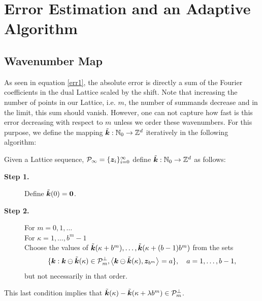 \documentclass[graybox,footinfo]{svmult}
\newcommand{\Z}{\mathbb{Z}} %
\newcommand{\N}{\mathbb{N}} %
\newcommand{\bszero}{\boldsymbol{0}} %
\newcommand{\bsz}{\boldsymbol{z}}    %
\begin{document}
\section{Error Estimation and an Adaptive Algorithm}

\subsection{Wavenumber Map}

As seen in equation \eqref{err1}, the absolute error is directly a sum of the Fourier coefficients in the dual Lattice scaled by the shift. Note that increasing the number of points in our Lattice, i.e. $m$, the number of summands decrease and in the limit, this sum should vanish. However, one can not capture how fast is this error decreasing with respect to $m$ unless we order these wavenumbers. For this purpose, we define the mapping $\tvk: \N_0 \to \Z^d$ iteratively in the following algorithm:

\begin{algo} \label{wavenummapalgo} Given a Lattice sequence, $\cp_{\infty} = \{\bsz_i\}_{i=0}^{\infty}$ define $\tvk: \N_0 \to \Z^d$ as follows:
\begin{description}
\item[\textbf{Step 1.}] Define $\tvk(0)=\bszero$.

\item[\textbf{Step 2.}] For $m=0, 1, \ldots$ \\
\hspace*{1.3cm} For $\kappa = 1, \ldots, b^{m} -1 $ \\
\hspace*{1.6cm} Choose the values of $\tilde{\boldsymbol{k}}(\kappa+b^{m}), \ldots, \tilde{\boldsymbol{k}}(\kappa+(b-1)b^{m})$ from the sets
\[
\{\bsk : \bsk \ominus \tvk(\kappa) \in \cp_{m}^{\perp}, \ip{\bsk \ominus \tvk(\kappa)}{\bsz_{b^m}}=a \}, \quad a=1, \ldots, b-1,
\]
\hspace*{1.6cm} but not necessarily in that order.
\end{description}
\end{algo}





This last condition implies that $\tilde{\boldsymbol{k}}(\kappa) - \tilde{\boldsymbol{k}}(\kappa+\lambda b^m) \in \mathcal{P}_m^{\perp}$.
\end{document}
